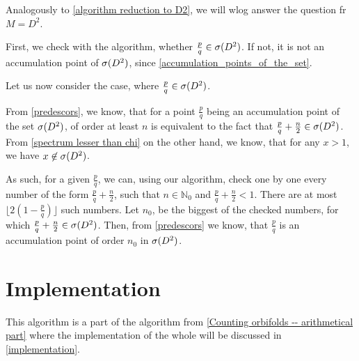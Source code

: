 Analogously to \ref{algorithm reduction to D2}, we will wlog answer the question fr $ M = D^2$. 

First, we check with the algorithm, whether $\frac{p}{q} \in {{\sigma}(D^2)}$. If not, it is not 
an accumulation point of ${{\sigma}(D^2)}$, since \ref{accumulation_points_of_the_set}.

Let us now consider the case, where $\frac{p}{q} \in {{\sigma}(D^2)}$.

From \ref{predescors}, we know, that for a point $\frac{p}{q}$ being an accumulation 
point of the set ${{\sigma}(D^2)}$, of order at least $n$ is equivalent to the fact that 
$\frac{p}{q} + \frac{n}{2} \in {{\sigma}(D^2)}$. From \ref{spectrum lesser than chi} 
on the other hand, we know, that 
for any $x > 1$, we have $x \not\in {{\sigma}(D^2)}$.

  
As such, for a given $\frac{p}{q}$, we can, using our algorithm, check one by one 
every number of the form $\frac{p}{q} + \frac{n}{2}$, such that $n \in \mathbb{N}_0$ and 
$\frac{p}{q} + \frac{n}{2} < 1$. There are at most 
$\lfloor 2 \left(1 -\frac{p}{q} \right)\rfloor$ such numbers. 
Let $n_0$, be the biggest of the checked numbers, for which 
$\frac{p}{q} + \frac{n}{2} \in {{\sigma}(D^2)}$. 
Then, from \ref{predescors} 
we know, that $\frac{p}{q}$ is an accumulation point of order $n_0$ in ${{\sigma}(D^2)}$. 

 





\section{Implementation}
This algorithm is a part of the algorithm from \ref{Counting orbifolds -- arithmetical part} 
where the implementation of the whole will be discussed in \ref{implementation}.
